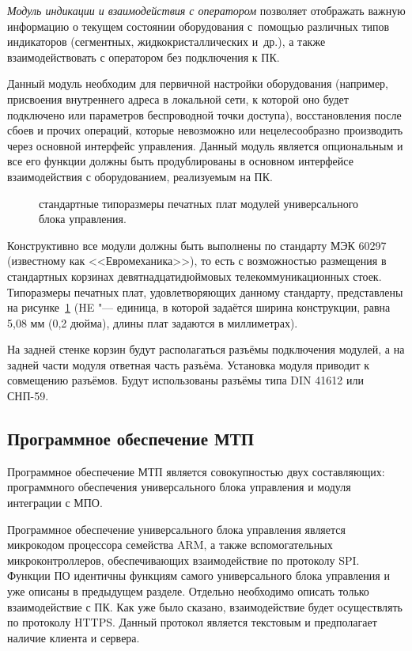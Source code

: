 \textit{Модуль индикации и взаимодействия с оператором} позволяет отображать важную информацию о текущем состоянии оборудования с~помощью различных типов индикаторов (сегментных, жидкокристаллических и~др.), а также взаимодействовать с оператором без подключения к ПК.

Данный модуль необходим для первичной настройки оборудования (например, присвоения внутреннего адреса в локальной сети, к которой оно будет подключено или параметров беспроводной точки доступа), восстановления после сбоев и прочих операций, которые невозможно или нецелесообразно производить через основной интерфейс управления. Данный модуль является опциональным и все его функции должны быть продублированы в основном интерфейсе взаимодействия с оборудованием, реализуемым на ПК.

\begin{figure}[ht]
	\caption{стандартные типоразмеры печатных плат модулей универсального блока управления.}\label{fig:euromech}
\end{figure}

Конструктивно все модули должны быть выполнены по стандарту МЭК 60297 (известному как <<Евромеханика>>), то есть с возможностью размещения в стандартных корзинах девятнадцатидюймовых телекоммуникационных стоек. Типоразмеры печатных плат, удовлетворяющих данному стандарту, представлены на рисунке~\cref{fig:euromech} (\foreignlanguage{english}{HE} "--- единица, в которой задаётся ширина конструкции, равна 5,08 мм (0,2 дюйма), длины плат задаются в миллиметрах).

На задней стенке корзин будут располагаться разъёмы подключения модулей, а на задней части модуля ответная часть разъёма. Установка модуля приводит к совмещению разъёмов. Будут использованы разъёмы типа DIN 41612 или СНП-59.

\subsection{Программное обеспечение \foreignlanguage{english}{МТП}}

Программное обеспечение \foreignlanguage{english}{МТП} является совокупностью двух составляющих: программного обеспечения универсального блока управления и модуля интеграции с \foreignlanguage{english}{МПО}. 

Программное обеспечение универсального блока управления является микрокодом процессора семейства \foreignlanguage{english}{ARM}, а также вспомогательных микроконтроллеров, обеспечивающих взаимодействие по протоколу \foreignlanguage{english}{SPI}. Функции ПО идентичны функциям самого универсального блока управления и уже описаны в предыдущем разделе. Отдельно необходимо описать только взаимодействие с ПК. Как уже было сказано, взаимодействие будет осуществлять по протоколу \foreignlanguage{english}{HTTPS}. Данный протокол является текстовым и предполагает наличие клиента и сервера.

